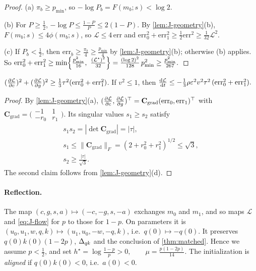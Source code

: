 \begin{proof}
(a) $\pi_b\ge p_{\min}$, so $-\log P_b=F(m_b;s)<\log2$.

(b) For $P\ge\frac{1}{2}$, $-\log P\le\frac{1-P}{P}\le2(1-P)$. By \cref{lem:J-geometry}(b), $F(m_b;s)\le4\phi(m_b;s)$, so $\mathcal L\le4\,\mathrm{err}$ and
$\mathrm{err}_0^2+\mathrm{err}_1^2\ge\frac{1}{2}\mathrm{err}^2\ge\frac{1}{32}\mathcal L^2$.

(c) If $P_b<\frac{1}{2}$, then $\mathrm{err}_b\ge\frac{\pi_b}{4}\ge\frac{p_{\min}}{4}$ by \cref{lem:J-geometry}(b); otherwise (b) applies. So
 $\mathrm{err}_0^2+\mathrm{err}_1^2\ge\min\Bigl\{\frac{p_{\min}^2}{16},\ \frac{(\mathcal L^\star)^2}{32}\Bigr\}=\frac{(\log2)^2}{128}\,p_{\min}^2\ge\frac{p_{\min}^2}{267}. \qedhere$ 
\end{proof}

\begin{lemma}
\label{lem:J-gradient}
$(\pd{\mathcal L}{c})^2+(\pd{\mathcal L}{g})^2\ge\frac{1}{3}\tau^2(\mathrm{err}_0^2+\mathrm{err}_1^2)$. If $v^2\le1$, then
 $\ddt{\mathcal L}\le-\tfrac{1}{3}\rho\initscale^2v^2\tau^2\,(\mathrm{err}_0^2+\mathrm{err}_1^2).$ 
\end{lemma}

\begin{proof}
By \cref{lem:J-geometry}(a), $(\pd{\mathcal L}{c},\pd{\mathcal L}{g})^\top=\mathbf C_{\mathrm{grad}}(\mathrm{err}_0,\mathrm{err}_1)^\top$ with $\mathbf C_{\mathrm{grad}}=\bigl(\begin{smallmatrix}-1&1\\-r_0&r_1\end{smallmatrix}\bigr)$. Its singular values $s_1\ge s_2$
satisfy
 \[
\begin{gathered}
s_1s_2=|\det\mathbf C_{\mathrm{grad}}|=|\tau|,\\ s_1\le\|\mathbf C_{\mathrm{grad}}\|_F=(2+r_0^2+r_1^2)^{1/2}\le\sqrt3,\\ s_2\ge\frac{|\tau|}{\sqrt3} .
\end{gathered}
\] 
The second claim follows from \cref{lem:J-geometry}(d).
\end{proof}

\paragraph{Reflection.} The map $(c,g,s,a)\mapsto(-c,-g,s,-a)$ exchanges $m_0$ and $m_1$, and so maps $\mathcal L$ and \cref{eq:J-flow} for $p$ to those
for $1-p$. On parameters it is $(u_0,u_1,w,q,k)\mapsto(u_1,u_0,-w,-q,k)$, i.e.\ $q(0)\mapsto-q(0)$. It preserves $q(0)k(0)(1-2p)$, $\Delta_{qk}$ and the
conclusion of \cref{thm:matched}. Hence we assume $p<\frac{1}{2}$, and set
 $h^\star=\log\frac{1-p}{p}>0,\qquad \mu=\frac{p(1-2p)}{14}.$ 
The initialization is \emph{aligned} if $q(0)k(0)<0$, i.e.\ $a(0)<0$.


